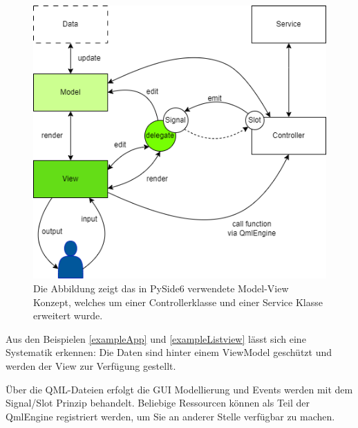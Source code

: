 \label{exampleListview}
\newpage

\begin{figure}
        \caption[Model-View Konzept mit zusätzlichem Controller und Service ]
        {\small Die Abbildung zeigt das in PySide6 verwendete Model-View Konzept, welches um einer Controllerklasse und
        einer Service Klasse erweitert wurde. }\label{fig:figure10}
        \includegraphics[width = \textwidth ]{Bilder/MVCS_Beispiel}
        \centering
\end{figure}

\newpage

Aus den Beispielen \ref{exampleApp} und \ref{exampleListview} lässt sich eine Systematik erkennen:
Die Daten sind hinter einem ViewModel geschützt und werden der View zur Verfügung gestellt.

Über die QML-Dateien erfolgt die GUI Modellierung und Events werden mit dem Signal/Slot Prinzip behandelt.
Beliebige Ressourcen können als Teil der QmlEngine registriert werden, um Sie an anderer Stelle verfügbar zu machen.

